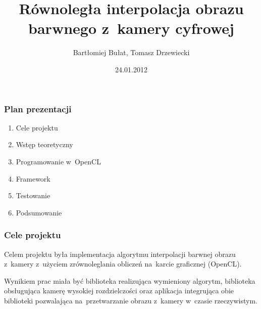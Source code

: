 \documentclass{beamer}
\title[Interpolacja barwna obrazu]{Równoległa interpolacja obrazu barwnego
  z~kamery cyfrowej}
\author[B. Bułat, T. Drzewiecki]{Bartłomiej Bułat, Tomasz Drzewiecki}
\date[2011]{24.01.2012}
\institute[AGH]
{Wydział EAIiIB\\ 
Katedra Automatyki i~Inżynierii Biomedycznej
}
\begin{document}
{
 \begin{frame}
   \titlepage
 \end{frame}
}



\begin{frame}
\frametitle{Plan prezentacji}
	
  \begin{enumerate}
  	\item Cele projektu
	  \item Wstęp teoretyczny
  	\item Programowanie w~OpenCL
  	\item Framework
  	\item Testowanie
  	\item Podsumowanie
	\end{enumerate}

\end{frame}

\begin{frame}
	\frametitle{Cele projektu}
	
  Celem projektu była implementacja algorytmu interpolacji barwnej obrazu z~kamery
  z~użyciem zrównoleglania obliczeń na~karcie graficznej (OpenCL). 
  
  Wynikiem prac miała być
  biblioteka realizująca wymieniony algorytm, biblioteka obsługująca kamerę wysokiej rozdzielczości
  oraz aplikacja integrująca obie biblioteki pozwalająca na~przetwarzanie obrazu z~kamery w~czasie 
  rzeczywistym.  
\end{frame}
\end{document}
